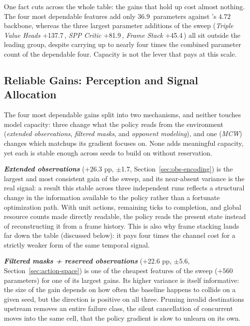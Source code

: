 One fact cuts across the whole table: the gains that hold up cost almost nothing. The four most dependable features add only $36.9$\, parameters against 's $4.72$\, backbone, whereas the three largest parameter additions of the sweep (\emph{Triple Value Heads} $+$137.7\,, \emph{SPP Critic} $+$81.9\,, \emph{Frame Stack} $+$45.4\,) all sit outside the leading group, despite carrying up to nearly four times the combined parameter count of the dependable four. Capacity is not the lever that pays at this scale.

\subsection{Reliable Gains: Perception and Signal Allocation}

The four most dependable gains split into two mechanisms, and neither touches model capacity: three change what the policy reads from the environment (\emph{extended observations}, \emph{filtered masks}, and \emph{opponent modeling}), and one (\emph{MCW}) changes which matchups its gradient focuses on. None adds meaningful capacity, yet each is stable enough across seeds to build on without reservation.

\emph{\textbf{Extended observations}} ($+$26.3 pp, $\pm$1.7, Section~\ref{sec:obs-encoding}) is the largest and most consistent gain of the sweep, and its near-absent variance is the real signal: a result this stable across three independent runs reflects a structural change in the information available to the policy rather than a fortunate optimization path. With unit actions, remaining ticks to completion, and global resource counts made directly readable, the policy reads the present state instead of reconstructing it from a frame history. This is also why frame stacking lands far down the table (discussed below): it pays four times the channel cost for a strictly weaker form of the same temporal signal.

\emph{\textbf{Filtered masks + reserved observations}} ($+$22.6 pp, $\pm$5.6, Section~\ref{sec:action-space}) is one of the cheapest features of the sweep ($+560$ parameters) for one of its largest gains. Its higher variance is itself informative: the size of the gain depends on how often the baseline happens to collide on a given seed, but the direction is positive on all three. Pruning invalid destinations upstream removes an entire failure class, the silent cancellation of concurrent moves into the same cell, that the policy gradient is slow to unlearn on its own.

